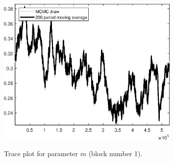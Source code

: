 \begin{figure}[H]
\centering
  \includegraphics[width=0.8\textwidth]{BRS_growth_KPR/graphs/TracePlot_m_blck_1}\\
    \caption{Trace plot for parameter ${m}$ (block number 1).}
\end{figure}
